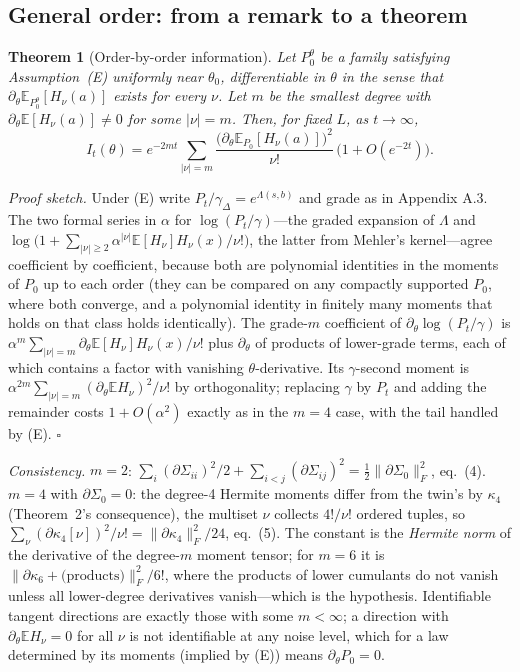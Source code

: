 \documentclass[11pt,a4paper]{article}
\newcommand{\Frob}[1]{\lVert #1 \rVert_{F}}
\newcommand{\E}{\mathbb{E}}
\newtheorem{theorem}{Theorem}
\theoremstyle{definition}
\theoremstyle{remark}
\begin{document}
\subsection{General order: from a remark to a theorem}

\begin{theorem}[Order-by-order information]
\label{thm:general}
Let $P_0^\theta$ be a family satisfying Assumption~(E) uniformly near $\theta_0$, differentiable in $\theta$ in the sense that $\partial_\theta\E_{P_0^\theta}[H_\nu(a)]$ exists for every $\nu$. Let $m$ be the smallest degree with $\partial_\theta\E[H_\nu(a)]\ne0$ for some $|\nu|=m$. Then, for fixed $L$, as $t\to\infty$,
\[
  I_t(\theta)=e^{-2mt}\sum_{|\nu|=m}\frac{\bigl(\partial_\theta\E_{P_0}[H_\nu(a)]\bigr)^2}{\nu!}\,\bigl(1+O(e^{-2t})\bigr).
\]
\end{theorem}
\noindent\emph{Proof sketch.} Under (E) write $P_t/\gamma_\Delta=e^{\Lambda(s,b)}$ and grade as in Appendix A.3. The two formal series in $\alpha$ for $\log(P_t/\gamma)$---the graded expansion of $\Lambda$ and $\log\bigl(1+\sum_{|\nu|\ge2}\alpha^{|\nu|}\E[H_\nu]H_\nu(x)/\nu!\bigr)$, the latter from Mehler's kernel---agree coefficient by coefficient, because both are polynomial identities in the moments of $P_0$ up to each order (they can be compared on any compactly supported $P_0$, where both converge, and a polynomial identity in finitely many moments that holds on that class holds identically). The grade-$m$ coefficient of $\partial_\theta\log(P_t/\gamma)$ is $\alpha^m\sum_{|\nu|=m}\partial_\theta\E[H_\nu]H_\nu(x)/\nu!$ plus $\partial_\theta$ of products of lower-grade terms, each of which contains a factor with vanishing $\theta$-derivative. Its $\gamma$-second moment is $\alpha^{2m}\sum_{|\nu|=m}(\partial_\theta\E H_\nu)^2/\nu!$ by orthogonality; replacing $\gamma$ by $P_t$ and adding the remainder costs $1+O(\alpha^2)$ exactly as in the $m=4$ case, with the tail handled by (E). $\square$

\noindent\emph{Consistency.} $m=2$: $\sum_i(\partial\Sigma_{ii})^2/2+\sum_{i<j}(\partial\Sigma_{ij})^2=\tfrac12\Frob{\partial\Sigma_0}^2$, eq.~(4). $m=4$ with $\partial\Sigma_0=0$: the degree-4 Hermite moments differ from the twin's by $\kappa_4$ (Theorem~2's consequence), the multiset $\nu$ collects $4!/\nu!$ ordered tuples, so $\sum_\nu(\partial\kappa_4[\nu])^2/\nu!=\Frob{\partial\kappa_4}^2/24$, eq.~(5). The constant is the \emph{Hermite norm} of the derivative of the degree-$m$ moment tensor; for $m=6$ it is $\Frob{\partial\kappa_6+\text{(products)}}^2/6!$, where the products of lower cumulants do not vanish unless all lower-degree derivatives vanish---which is the hypothesis. Identifiable tangent directions are exactly those with some $m<\infty$; a direction with $\partial_\theta\E H_\nu=0$ for all $\nu$ is not identifiable at any noise level, which for a law determined by its moments (implied by (E)) means $\partial_\theta P_0=0$.
\end{document}
